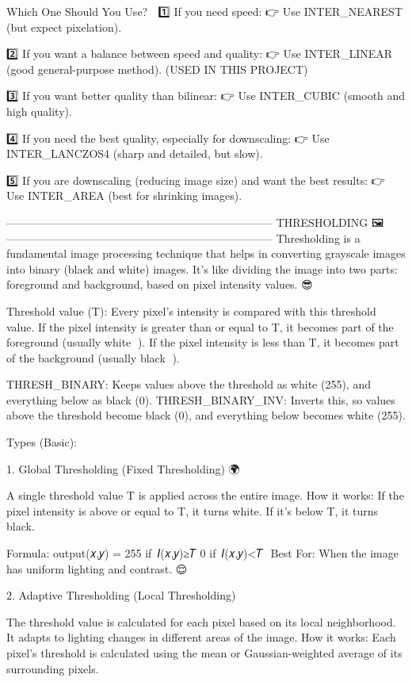 Which One Should You Use? 🤔
1️⃣ If you need speed:
👉 Use INTER_NEAREST (but expect pixelation).

2️⃣ If you want a balance between speed and quality:
👉 Use INTER_LINEAR (good general-purpose method). (USED IN THIS PROJECT)

3️⃣ If you want better quality than bilinear:
👉 Use INTER_CUBIC (smooth and high quality).

4️⃣ If you need the best quality, especially for downscaling:
👉 Use INTER_LANCZOS4 (sharp and detailed, but slow).

5️⃣ If you are downscaling (reducing image size) and want the best results:
👉 Use INTER_AREA (best for shrinking images).

------------------------------------------------------------------------
THRESHOLDING 🖼️
------------------------------------------------------------------------
Thresholding is a fundamental image processing technique that helps in converting grayscale images into binary (black and white) images. It's like dividing the image into two parts: foreground and background, based on pixel intensity values. 😎

Threshold value (T): Every pixel's intensity is compared with this threshold value.
If the pixel intensity is greater than or equal to T, it becomes part of the foreground (usually white 🌟).
If the pixel intensity is less than T, it becomes part of the background (usually black 🖤).

THRESH_BINARY: Keeps values above the threshold as white (255), and everything below as black (0).
THRESH_BINARY_INV: Inverts this, so values above the threshold become black (0), and everything below becomes white (255).

Types (Basic):

1. Global Thresholding (Fixed Thresholding) 🌍

A single threshold value T is applied across the entire image.
How it works: If the pixel intensity is above or equal to T, it turns white. If it's below T, it turns black.

Formula:
output(𝑥,𝑦) = 255 if 𝐼(𝑥,𝑦)≥𝑇
              0  if 𝐼(𝑥,𝑦)<𝑇
​
Best For: When the image has uniform lighting and contrast. 😌

2. Adaptive Thresholding (Local Thresholding) 🌱

The threshold value is calculated for each pixel based on its local neighborhood. It adapts to lighting changes in different areas of the image.
How it works: Each pixel’s threshold is calculated using the mean or Gaussian-weighted average of its surrounding pixels.

